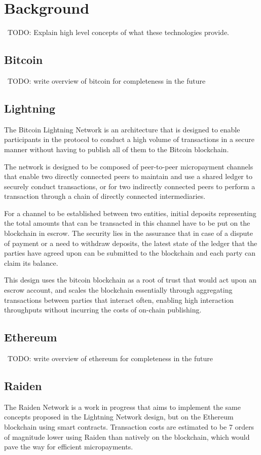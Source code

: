 \documentclass[12pt]{article}
\newcommand{\todo}[1]{{\color{red}\ TODO: {#1}}}
\begin{document}
\section{Background}
\todo{Explain high level concepts of what these technologies provide.}

\subsection{Bitcoin}
\todo{write overview of bitcoin for completeness in the future} \cite{bitcoin}
\subsection{Lightning}
The Bitcoin Lightning Network\cite{lightning} is an architecture that is designed to enable participants in the protocol to conduct a high volume of transactions in a secure manner without having to publish all of them to the Bitcoin blockchain.

The network is designed to be composed of peer-to-peer micropayment channels that enable two directly connected peers to maintain and use a shared ledger to securely conduct transactions, or for two indirectly connected peers to perform a transaction through a chain of directly connected intermediaries.

For a channel to be established between two entities, initial deposits representing the total amounts that can be transacted in this channel have to be put on the blockchain in escrow. The security lies in the assurance that in case of a dispute of payment or a need to withdraw deposits, the latest state of the ledger that the parties have agreed upon can be submitted to the blockchain and each party can claim its balance.

This design uses the bitcoin blockchain as a root of trust that would act upon an escrow account, and scales the blockchain essentially through aggregating transactions between parties that interact often, enabling high interaction throughputs without incurring the costs of on-chain publishing.

\subsection{Ethereum}
\todo{write overview of ethereum for completeness in the future} \cite{ethereum}

\subsection{Raiden}
The Raiden Network\cite{raiden} is a work in progress that aims to implement the same concepts proposed in the Lightning Network design, but on the Ethereum blockchain using smart contracts. Transaction costs are estimated to be 7 orders of magnitude lower using Raiden than natively on the blockchain, which would pave the way for efficient micropayments.
\end{document}
